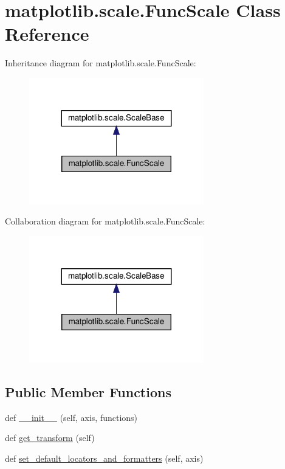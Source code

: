 \hypertarget{classmatplotlib_1_1scale_1_1FuncScale}{}\section{matplotlib.\+scale.\+Func\+Scale Class Reference}
\label{classmatplotlib_1_1scale_1_1FuncScale}


Inheritance diagram for matplotlib.\+scale.\+Func\+Scale\+:
\nopagebreak
\begin{figure}[H]
\begin{center}
\leavevmode
\includegraphics[width=215pt]{classmatplotlib_1_1scale_1_1FuncScale__inherit__graph}
\end{center}
\end{figure}


Collaboration diagram for matplotlib.\+scale.\+Func\+Scale\+:
\nopagebreak
\begin{figure}[H]
\begin{center}
\leavevmode
\includegraphics[width=215pt]{classmatplotlib_1_1scale_1_1FuncScale__coll__graph}
\end{center}
\end{figure}
\subsection*{Public Member Functions}
\begin{DoxyCompactItemize}
\item 
def \hyperlink{classmatplotlib_1_1scale_1_1FuncScale_a8daf975115c648b910c747898ba9d464}{\+\_\+\+\_\+init\+\_\+\+\_\+} (self, axis, functions)
\item 
def \hyperlink{classmatplotlib_1_1scale_1_1FuncScale_af5883296a266afd787c18b3afb20315d}{get\+\_\+transform} (self)
\item 
def \hyperlink{classmatplotlib_1_1scale_1_1FuncScale_aa41cb6e9c292f74d13cc3ddfe4c6b64a}{set\+\_\+default\+\_\+locators\+\_\+and\+\_\+formatters} (self, axis)
\end{DoxyCompactItemize}
